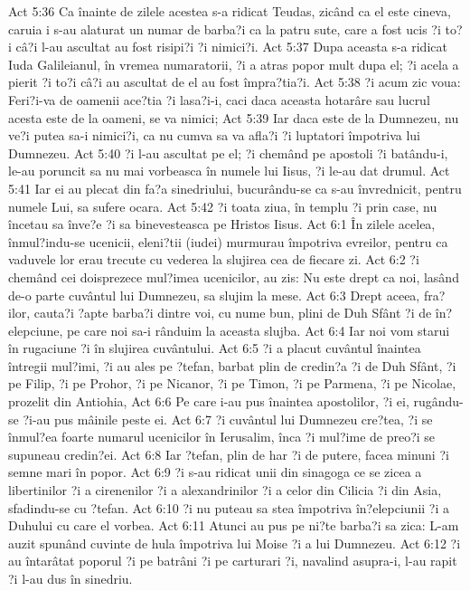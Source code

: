 Act 5:36  Ca înainte de zilele acestea s-a ridicat Teudas, zicând ca el este cineva, caruia i s-au alaturat un numar de barba?i ca la patru sute, care a fost ucis ?i to?i câ?i l-au ascultat au fost risipi?i ?i nimici?i.
Act 5:37  Dupa aceasta s-a ridicat Iuda Galileianul, în vremea numaratorii, ?i a atras popor mult dupa el; ?i acela a pierit ?i to?i câ?i au ascultat de el au fost împra?tia?i.
Act 5:38  ?i acum zic voua: Feri?i-va de oamenii ace?tia ?i lasa?i-i, caci daca aceasta hotarâre sau lucrul acesta este de la oameni, se va nimici;
Act 5:39  Iar daca este de la Dumnezeu, nu ve?i putea sa-i nimici?i, ca nu cumva sa va afla?i ?i luptatori împotriva lui Dumnezeu.
Act 5:40  ?i l-au ascultat pe el; ?i chemând pe apostoli ?i batându-i, le-au poruncit sa nu mai vorbeasca în numele lui Iisus, ?i le-au dat drumul.
Act 5:41  Iar ei au plecat din fa?a sinedriului, bucurându-se ca s-au învrednicit, pentru numele Lui, sa sufere ocara.
Act 5:42  ?i toata ziua, în templu ?i prin case, nu încetau sa înve?e ?i sa binevesteasca pe Hristos Iisus.
Act 6:1  În zilele acelea, înmul?indu-se ucenicii, eleni?tii (iudei) murmurau împotriva evreilor, pentru ca vaduvele lor erau trecute cu vederea la slujirea cea de fiecare zi.
Act 6:2  ?i chemând cei doisprezece mul?imea ucenicilor, au zis: Nu este drept ca noi, lasând de-o parte cuvântul lui Dumnezeu, sa slujim la mese.
Act 6:3  Drept aceea, fra?ilor, cauta?i ?apte barba?i dintre voi, cu nume bun, plini de Duh Sfânt ?i de în?elepciune, pe care noi sa-i rânduim la aceasta slujba.
Act 6:4  Iar noi vom starui în rugaciune ?i în slujirea cuvântului.
Act 6:5  ?i a placut cuvântul înaintea întregii mul?imi, ?i au ales pe ?tefan, barbat plin de credin?a ?i de Duh Sfânt, ?i pe Filip, ?i pe Prohor, ?i pe Nicanor, ?i pe Timon, ?i pe Parmena, ?i pe Nicolae, prozelit din Antiohia,
Act 6:6  Pe care i-au pus înaintea apostolilor, ?i ei, rugându-se ?i-au pus mâinile peste ei.
Act 6:7  ?i cuvântul lui Dumnezeu cre?tea, ?i se înmul?ea foarte numarul ucenicilor în Ierusalim, înca ?i mul?ime de preo?i se supuneau credin?ei.
Act 6:8  Iar ?tefan, plin de har ?i de putere, facea minuni ?i semne mari în popor.
Act 6:9  ?i s-au ridicat unii din sinagoga ce se zicea a libertinilor ?i a cirenenilor ?i a alexandrinilor ?i a celor din Cilicia ?i din Asia, sfadindu-se cu ?tefan.
Act 6:10  ?i nu puteau sa stea împotriva în?elepciunii ?i a Duhului cu care el vorbea.
Act 6:11  Atunci au pus pe ni?te barba?i sa zica: L-am auzit spunând cuvinte de hula împotriva lui Moise ?i a lui Dumnezeu.
Act 6:12  ?i au întarâtat poporul ?i pe batrâni ?i pe carturari ?i, navalind asupra-i, l-au rapit ?i l-au dus în sinedriu.
